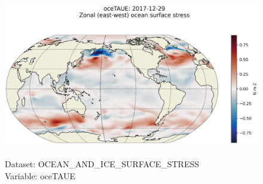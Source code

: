 \begin{figure}[H]
\centering
\includegraphics[scale=0.5]{../images/plots/latlon_plots/Ocean_and_Sea-Ice_Surface_Stress/oceTAUE.png}
\caption{\\Dataset: OCEAN\_AND\_ICE\_SURFACE\_STRESS\\Variable: oceTAUE}
\label{tab:table-OCEAN_AND_ICE_SURFACE_STRESS_oceTAUE-Plot}
\end{figure}
\pagebreak
